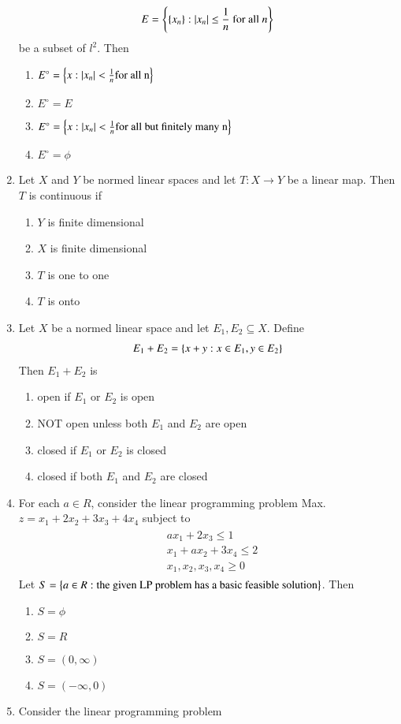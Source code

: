 \documentclass[journal]{IEEEtran}
\begin{document}
\begin{enumerate}
\begin{align*}
		E=\left\{\left\{x_{n}\right\}:\left\vert x_{n}\right\vert\leq \frac{1}{n} \text { for all } n\right\}
             \end{align*}
	     be a subset of $l^2$. Then
                \begin{enumerate}
			\item $E^{\circ}=\left\{x:\left\vert x_{n}\right\vert<\frac{1}{n} \text{for all n}\right\}$
			\item $E^{\circ}=E$
			\item $E^{\circ}=\left\{x:\left\vert x_{n}\right\vert<\frac{1}{n} \text{for all but finitely many n}\right\}$
			\item $E^{\circ}=\phi$
        	\end{enumerate}		
	\item Let $X$ and $Y$ be normed linear spaces and let $T: X \rightarrow Y$ be a linear map. Then $T$ is continuous if
		\begin{enumerate}
			\item $Y$ is finite dimensional
			\item $X$ is finite dimensional
			\item $T$ is one to one
			\item $T$ is onto
        	\end{enumerate}	
	\item Let $X$ be a normed linear space and let $E_{1}, E_{2} \subseteq X$. Define
           \begin{align*}
		E_{1}+E_{2}=\left\{x+y: x \in E_{1}, y \in E_{2}\right\} 
             \end{align*}
             Then $E_{1}+E_{2}$ is
		\begin{enumerate}
			\item open if $E_{1}$ or $E_{2}$ is open
			\item NOT open unless both $E_{1}$ and $E_{2}$ are open
			\item closed if $E_{1}$ or $E_{2}$ is closed
			\item closed if both $E_{1}$ and $E_{2}$ are closed
        	\end{enumerate}	
	\item For each $a \in R$, consider the linear programming problem Max. $z=x_{1}+2 x_{2}+3 x_{3}+4 x_{4}$
subject to 
           \begin{align*}
		\begin{aligned}
& a x_{1}+2 x_{3} \leq 1 \\
& x_{1}+a x_{2}+3 x_{4} \leq 2 \\
& x_{1}, x_{2}, x_{3}, x_{4} \geq 0
\end{aligned} 
             \end{align*} 
	     Let $S=\left\{a \in R : \text{the given LP problem has a basic feasible solution} \right\}$. Then
		\begin{enumerate}
			\item $S=\phi$
			\item $S=R$
			\item $S=(0, \infty)$
			\item $S=(-\infty, 0)$
        	\end{enumerate}	
	\item Consider the linear programming problem


\end{enumerate}
\end{document}
